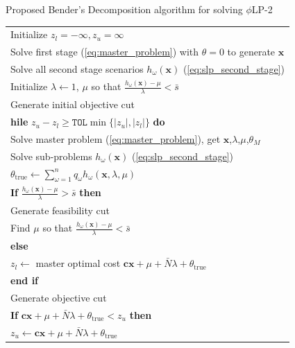 \documentclass[ijoc,letterpaper]{informs3} %
\newcommand{\x}{\mathbf{x}}
\renewcommand{\c}{\mathbf{c}}
\newcommand{\plp}{$\phi$LP-2}
\begin{document}
\begin{figure}
\TABLE
	{
		Proposed Bender's Decomposition algorithm for solving \plp
		\label{fig:algorithm}
	}
{\begin{tabular}{l}
	\hline
	Initialize $z_l = -\infty, z_u = \infty$ \\
	Solve first stage (\ref{eq:master_problem}) with $\theta = 0$  to generate $\x$ \\
	Solve all second stage scenarios $h_\omega(\x)$ (\ref{eq:slp_second_stage}) \\
	Initialize $\lambda \gets 1$, $\mu$ so that $\frac{h_\omega(\x) - \mu}{\lambda} < \bar{s}$ \\
	Generate initial objective cut \\
	\textbf{hile} $z_u - z_l \geq \texttt{TOL}\min\{|z_u|,|z_l|\}$ \textbf{do} \\
	\hspace{24pt} Solve master problem (\ref{eq:master_problem}), get $\x$,$\lambda$,$\mu$,$\theta_M$ \\
	\hspace{24pt} Solve sub-problems $h_\omega(\x)$ (\ref{eq:slp_second_stage}) \\
	\hspace{24pt} $\theta_{\text{true}} \gets \sum_{\omega=1}^n q_\omega h_\omega(\x,\lambda,\mu)$ \\
	\hspace{24pt} \textbf{If} $\frac{h_\omega(\x) - \mu}{\lambda} > \bar{s}$ \textbf{then} \\
		\hspace{48pt} Generate feasibility cut \\
		\hspace{48pt} Find $\mu$ so that $\frac{h_\omega(\x) - \mu}{\lambda} < \bar{s}$ \\
	\hspace{24pt} \textbf{else} \\
		\hspace{48pt} $z_l \gets$ master optimal cost $\c\x + \mu + \bar{N}\lambda + \theta_{\text{true}}$ \\
	\hspace{24pt} \textbf{end if} \\
	\hspace{24pt} Generate objective cut \\
	\hspace{24pt} \textbf{If} $\c\x + \mu + \bar{N}\lambda + \theta_{\text{true}} < z_u$ \textbf{then} \\
		\hspace{48pt} $z_u \gets \c\x + \mu + \bar{N}\lambda + \theta_{\text{true}}$ \\

\end{tabular}}
\end{figure}
\end{document}

